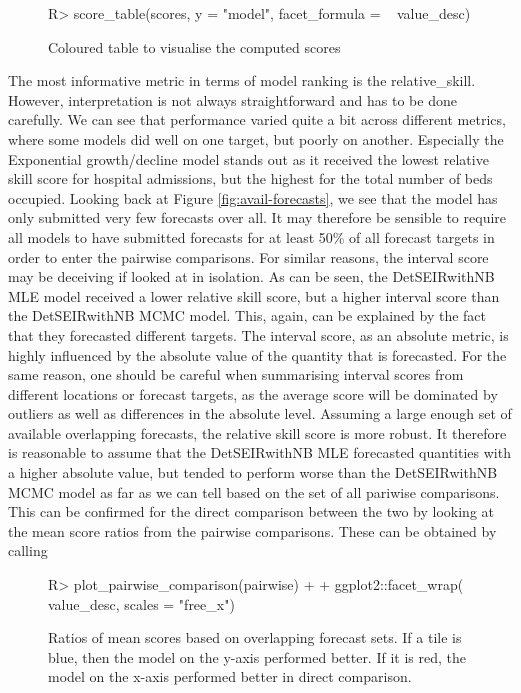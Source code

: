 \documentclass[article]{jss}
\begin{document}
\begin{figure}[h]
\centering
\begin{Schunk}
\begin{Sinput}
R> score_table(scores, y = "model", facet_formula = ~ value_desc)
\end{Sinput}
\end{Schunk}
\caption{\label{fig:score-table} Coloured table to visualise the computed scores}
\end{figure}

The most informative metric in terms of model ranking is the relative\_skill. However, interpretation is not always straightforward and has to be done carefully. We can see that performance varied quite a bit across different metrics, where some models did well on one target, but poorly on another. Especially the Exponential growth/decline model stands out as it received the lowest relative skill score for hospital admissions, but the highest for the total number of beds occupied. Looking back at Figure \ref{fig:avail-forecasts}, we see that the model has only submitted very few forecasts over all. It may therefore be sensible to require all models to have submitted forecasts for at least 50\% of all forecast targets in order to enter the pairwise comparisons. For similar reasons, the interval score may be deceiving if looked at in isolation. As can be seen, the DetSEIRwithNB MLE model received a lower relative skill score, but a higher interval score than the DetSEIRwithNB MCMC model. This, again, can be explained by the fact that they forecasted different targets. The interval score, as an absolute metric, is highly influenced by the absolute value of the quantity that is forecasted. For the same reason, one should be careful when summarising interval scores from different locations or forecast targets, as the average score will be dominated by outliers as well as differences in the absolute level. Assuming a large enough set of available overlapping forecasts, the relative skill score is more robust. It therefore is reasonable to assume that the DetSEIRwithNB MLE forecasted quantities with a higher absolute value, but tended to perform worse than the DetSEIRwithNB MCMC model as far as we can tell based on the set of all pariwise comparisons. This can be confirmed for the direct comparison between the two by looking at the mean score ratios from the pairwise comparisons. These can be obtained by calling

\begin{figure}[h!]
\centering
\begin{Schunk}
\begin{Sinput}
R> plot_pairwise_comparison(pairwise) +
+    ggplot2::facet_wrap(~ value_desc, scales = "free_x") 
\end{Sinput}
\end{Schunk}
\caption{\label{fig:pairwise-comparison} Ratios of mean scores based on overlapping forecast sets. If a tile is blue, then the model on the y-axis performed better. If it is red, the model on the x-axis performed better in direct comparison. }
\end{figure}
\end{document}
